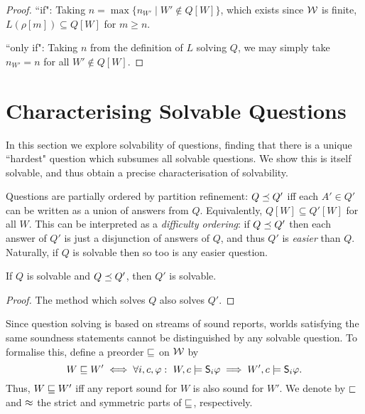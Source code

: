 \begin{proof}
    ``if": Taking $n = \max\{n_{W'} \mid W' \notin Q[W]\}$, which exists
    since $\mathcal{W}$ is finite, $L(\rho[m]) \subseteq Q[W]$ for $m \ge
    n$.

    ``only if": Taking $n$ from the definition of $L$ solving $Q$, we may
    simply take $n_{W'} = n$ for all $W' \notin Q[W]$.
\end{proof}

\section{Characterising Solvable Questions}
\label{sec_characterising_solvable_questions}

In this section we explore solvability of questions, finding that there is a
unique ``hardest" question which subsumes all solvable questions. We show this
is itself solvable, and thus obtain a precise characterisation of solvability.

Questions are partially ordered by partition refinement: $Q \preceq Q'$ iff
each $A' \in Q'$ can be written as a union of answers from $Q$. Equivalently,
$Q[W] \subseteq Q'[W]$ for all $W$. This can be interpreted as a
\emph{difficulty ordering}: if $Q \preceq Q'$ then each answer of $Q'$ is just
a disjunction of answers of $Q$, and thus $Q'$ is \emph{easier} than $Q$.
Naturally, if $Q$ is solvable then so too is any easier question.

\begin{proposition}
    \label{prop_easier_questions_also_solvable}
    If $Q$ is solvable and $Q \preceq Q'$, then $Q'$ is solvable.
\end{proposition}
\begin{proof}
    The method which solves $Q$ also solves $Q'$.
\end{proof}

Since question solving is based on streams of sound reports, worlds satisfying
the same soundness statements cannot be distinguished by any solvable question.
To formalise this, define a preorder $\sqsubseteq$ on $\mathcal{W}$ by
\[
    W \sqsubseteq W'
    \iff
    \forall i, c, \varphi:\
        W, c \models \mathsf{S}_i\varphi \implies W', c \models \mathsf{S}_i\varphi.
\]
Thus, $W \sqsubseteq W'$ iff any report sound for $W$ is also sound for $W'$. We
denote by $\sqsubset$ and $\approx$ the strict and symmetric parts of $\sqsubseteq$,
respectively.\footnotemark{}


